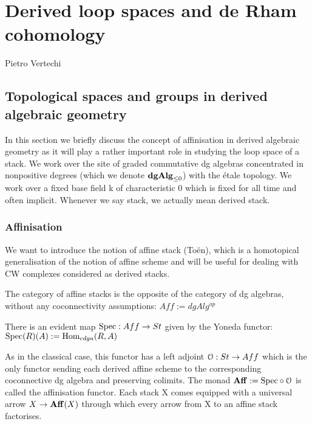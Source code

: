 \chapter{Derived loop spaces and de Rham cohomology}
\begin{flushright}
  Pietro Vertechi
\end{flushright}

\begin{refsection}

\section{Topological spaces and groups in derived algebraic geometry}
\label{topology}
In this section we briefly discuss the concept of affinisation in
derived algebraic geometry as it will play a rather important role in studying the loop space of a stack. We work over the site of graded commutative dg algebras
concentrated in nonpositive degrees (which we denote $\mathbf{dgAlg}_{\leq 0}$) with the étale topology. We work
over a fixed base field k of characteristic 0 which is fixed for all time and often implicit. Whenever we say stack, we actually mean derived stack.
\subsection{Affinisation}

We want to introduce the notion of affine stack (Toën), which is a homotopical generalisation of the notion of affine scheme and will be useful for dealing
with CW complexes considered as derived stacks.
\begin{definition}
The category of affine stacks is the opposite of the category of dg algebras, without any coconnectivity assumptions: $Aff:=dgAlg^{op}$
\end{definition}

\begin{remark}
There is an evident map $\mathrm{Spec}: Aff \to St $ given by the Yoneda functor: $\mathrm{Spec}(R)(A):=\mathrm{Hom}_{cdga}(R,A)$
\end{remark}

As in the classical case, this functor has a left adjoint $\mathcal{O}: St \to Aff$ which is the only functor sending each derived affine scheme to the corresponding coconnective
dg algebra and preserving colimits.
The monad $\mathbf{Aff}:= \mathrm{Spec}\circ\mathcal{O}$ is called the affinisation functor. Each stack X comes equipped with a universal arrow $X\to\mathbf{Aff}(X)$ through which every arrow
from X to an affine stack factorises.\\


\end{refsection}
